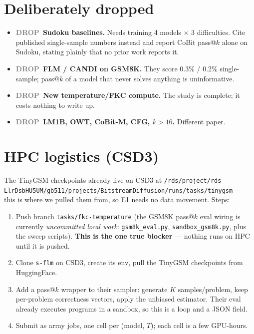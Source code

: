 \documentclass[11pt,a4paper]{article}
\newcommand{\drop}{\textcolor{gray}{\textbf{DROP}}}
\begin{document}
\section{Deliberately dropped}

\begin{itemize}
\item \drop\ \textbf{Sudoku baselines.} Needs training 4 models $\times$ 3 difficulties. Cite
      published single-sample numbers instead and report CoBit pass@$k$ alone on Sudoku, stating
      plainly that no prior work reports it.
\item \drop\ \textbf{FLM / CANDI on GSM8K.} They score 0.3\% / 0.2\% single-sample; pass@$k$ of a
      model that never solves anything is uninformative.
\item \drop\ \textbf{New temperature/FKC compute.} The study is complete; it costs nothing to write up.
\item \drop\ \textbf{LM1B, OWT, CoBit-M, CFG, $k>16$.} Different paper.
\end{itemize}

\section{HPC logistics (CSD3)}

The TinyGSM checkpoints already live on CSD3 at
\texttt{/rds/project/rds-LlrDsbHU5UM/gb511/projects/BitstreamDiffusion/runs/tasks/tinygsm} ---
this is where we pulled them from, so E1 needs no data movement. Steps:

\begin{enumerate}
\item Push branch \texttt{tasks/fkc-temperature} (the GSM8K pass@$k$ eval wiring is currently
      \emph{uncommitted local work}: \texttt{gsm8k\_eval.py}, \texttt{sandbox\_gsm8k.py},
      plus the sweep scripts). \textbf{This is the one true blocker} --- nothing runs on HPC until it is pushed.
\item Clone \texttt{s-flm} on CSD3, create its env, pull the TinyGSM checkpoints from HuggingFace.
\item Add a pass@$k$ wrapper to their sampler: generate $K$ samples/problem, keep per-problem
      correctness vectors, apply the unbiased estimator. Their eval already executes programs
      in a sandbox, so this is a loop and a JSON field.
\item Submit as array jobs, one cell per (model, $T$); each cell is a few GPU-hours.
\end{enumerate}
\end{document}
